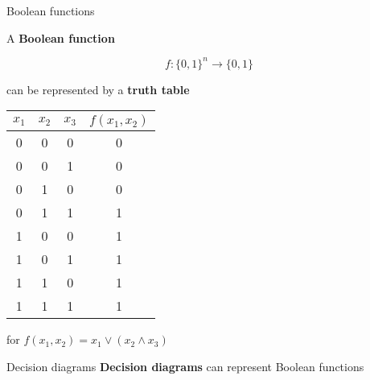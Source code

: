 \begin{frame}{Boolean functions}

    A \textbf{Boolean function}

    $$f : \{0, 1\}^n \to \{0, 1\}$$

    can be represented by a \textbf{truth table}

    \begin{center}
        \begin{tabular}{c|c|c|c}
            $x_1$ & $x_2$ & $x_3$ & $f(x_1, x_2)$ \\
            \hline
            0 & 0 & 0 & 0 \\
            0 & 0 & 1 & 0 \\
            0 & 1 & 0 & 0 \\
            0 & 1 & 1 & 1 \\
            1 & 0 & 0 & 1 \\
            1 & 0 & 1 & 1 \\
            1 & 1 & 0 & 1 \\
            1 & 1 & 1 & 1
        \end{tabular}

        \vspace{1em}
        \small{for $f(x_1, x_2) = x_1 \lor (x_2 \land x_3)$}
    \end{center}
\end{frame}

\begin{frame}{Decision diagrams}
    \textbf{Decision diagrams} can represent Boolean functions

\vspace{1em}
\end{frame}

